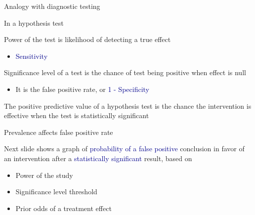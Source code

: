 \documentclass[ignorenonframetext,]{beamer}
\providecommand{\tightlist}{%
  \setlength{\itemsep}{0pt}\setlength{\parskip}{0pt}}
\begin{document}
\begin{frame}{%
\protect\hypertarget{analogy-with-diagnostic-testing}{%
Analogy with diagnostic testing}}

In a hypothesis test

Power of the test is likelihood of detecting a true effect

\begin{itemize}
\tightlist
\item
  \textcolor{darkblue}{Sensitivity}
\end{itemize}

Significance level of a test is the chance of test being positive when
effect is null

\begin{itemize}
\tightlist
\item
  It is the false positive rate, or
  \textcolor{darkblue}{1 - Specificity}
\end{itemize}

The positive predictive value of a hypothesis test is the chance the
intervention is effective when the test is statistically significant

\end{frame}

\begin{frame}{%
\protect\hypertarget{prevalence-affects-false-positive-rate}{%
Prevalence affects false positive rate}}

Next slide shows a graph of
\textcolor{darkblue}{probability of a false positive} conclusion in
favor of an intervention after a
\textcolor{darkblue}{statistically significant} result, based on

\begin{itemize}
\item
  Power of the study
\item
  Significance level threshold
\item
  \textcolor{forest}{Prior odds of a treatment effect}
\end{itemize}

\end{frame}
\end{document}
